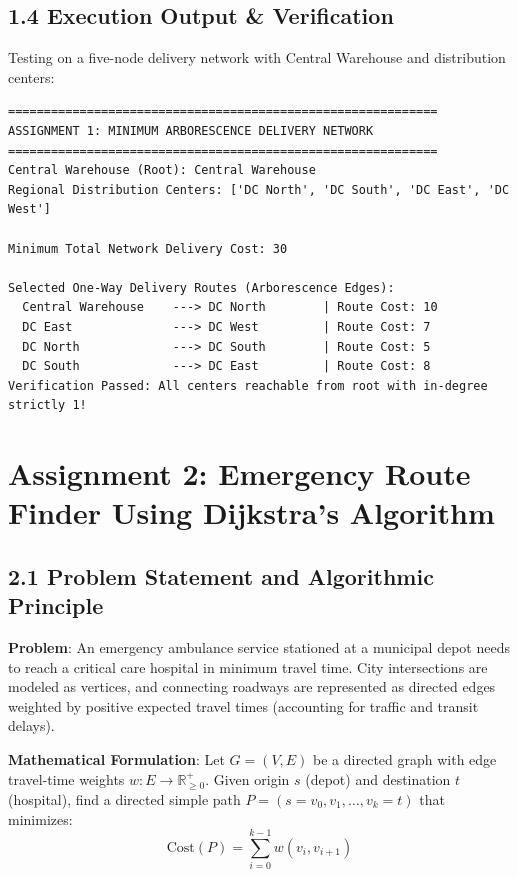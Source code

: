 \documentclass[12pt]{article}
\begin{document}
\subsection*{1.4 Execution Output \& Verification}
Testing on a five-node delivery network with Central Warehouse and distribution centers:
\begin{lstlisting}
============================================================
ASSIGNMENT 1: MINIMUM ARBORESCENCE DELIVERY NETWORK
============================================================
Central Warehouse (Root): Central Warehouse
Regional Distribution Centers: ['DC North', 'DC South', 'DC East', 'DC West']

Minimum Total Network Delivery Cost: 30

Selected One-Way Delivery Routes (Arborescence Edges):
  Central Warehouse    ---> DC North        | Route Cost: 10
  DC East              ---> DC West         | Route Cost: 7
  DC North             ---> DC South        | Route Cost: 5
  DC South             ---> DC East         | Route Cost: 8
Verification Passed: All centers reachable from root with in-degree strictly 1!
\end{lstlisting}

\newpage

\section*{Assignment 2: Emergency Route Finder Using Dijkstra's Algorithm}

\subsection*{2.1 Problem Statement and Algorithmic Principle}
\textbf{Problem}: An emergency ambulance service stationed at a municipal depot needs to reach a critical care hospital in minimum travel time. City intersections are modeled as vertices, and connecting roadways are represented as directed edges weighted by positive expected travel times (accounting for traffic and transit delays).

\textbf{Mathematical Formulation}:
Let $G = (V, E)$ be a directed graph with edge travel-time weights $w: E \to \mathbb{R}^+_{\ge 0}$. Given origin $s$ (depot) and destination $t$ (hospital), find a directed simple path $P = (s = v_0, v_1, \dots, v_k = t)$ that minimizes:
\[
\text{Cost}(P) = \sum_{i=0}^{k-1} w(v_i, v_{i+1})
\]
\end{document}
